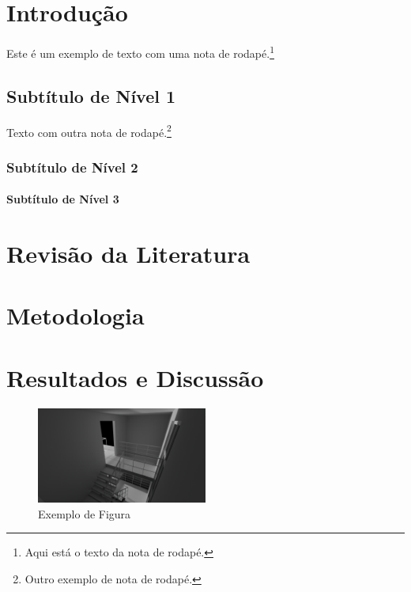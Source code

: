 \documentclass[12pt,openright,twoside,a4paper,brazil]{abntex2}
\begin{document}
\imprimircapa
\imprimirfolhaderosto

\sumario %
\listoffigures   %
\listoftables    %

\textual

\chapter{Introdução}
Este é um exemplo de texto com uma nota de rodapé.\footnote{Aqui está o texto da nota de rodapé.} \lipsum[1]

\section{Subtítulo de Nível 1}
Texto com outra nota de rodapé.\footnote{Outro exemplo de nota de rodapé.} \lipsum[2-3]

\subsection{Subtítulo de Nível 2}
\lipsum[4]
\subsubsection{Subtítulo de Nível 3}
\lipsum[5]

\chapter{Revisão da Literatura}
\lipsum[6-7]

\chapter{Metodologia}
\lipsum[8-9]

\chapter{Resultados e Discussão}
\lipsum[10]

\begin{figure}[ht]
\centering
\includegraphics[width=0.5\textwidth]{untitled.png}
\caption{Exemplo de Figura}
\label{fig:exemplo}
\end{figure}
\end{document}

